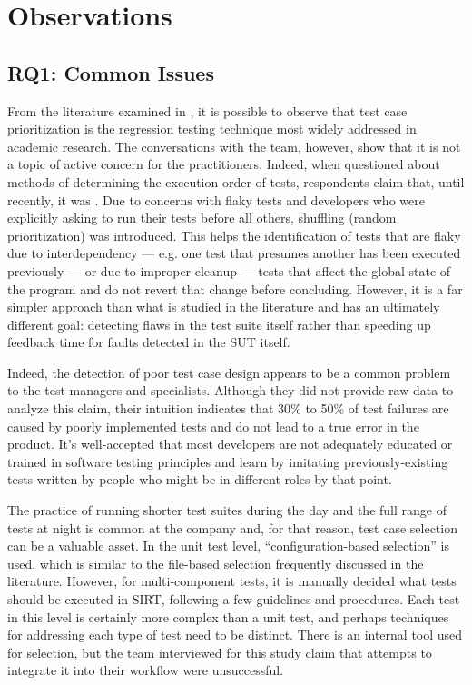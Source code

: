 \section{Observations}
\label{sec:ind_observations}

\subsection{RQ1: Common Issues}
\label{sec:ind_rq1}

From the literature examined in , it is possible to observe that test case prioritization is the regression testing technique most widely addressed in academic research.
The conversations with the team, however, show that it is not a topic of active concern for the practitioners.
Indeed, when questioned about methods of determining the execution order of tests, respondents claim that, until recently, it was .
Due to concerns with flaky tests and developers who were explicitly asking to run their tests before all others, shuffling (random prioritization) was introduced.
This helps the identification of tests that are flaky due to interdependency — e.g. one test that presumes another has been executed previously — or due to improper cleanup — tests that affect the global state of the program and do not revert that change before concluding.
However, it is a far simpler approach than what is studied in the literature and has an ultimately different goal: detecting flaws in the test suite itself rather than speeding up feedback time for faults detected in the SUT itself.

Indeed, the detection of poor test case design appears to be a common problem to the test managers and specialists.
Although they did not provide raw data to analyze this claim, their intuition indicates that 30\% to 50\% of test failures are caused by poorly implemented tests and do not lead to a true error in the product.
It's well-accepted that most developers are not adequately educated or trained in software testing principles and learn by imitating previously-existing tests written by people who might be in different roles by that point.

The practice of running shorter test suites during the day and the full range of tests at night is common at the company and, for that reason, test case selection can be a valuable asset.
In the unit test level, ``configuration-based selection'' is used, which is similar to the file-based selection frequently discussed in the literature.
However, for multi-component tests, it is manually decided what tests should be executed in SIRT, following a few guidelines and procedures.
Each test in this level is certainly more complex than a unit test, and perhaps techniques for addressing each type of test need to be distinct.
There is an internal tool used for selection, but the team interviewed for this study claim that attempts to integrate it into their workflow were unsuccessful.

